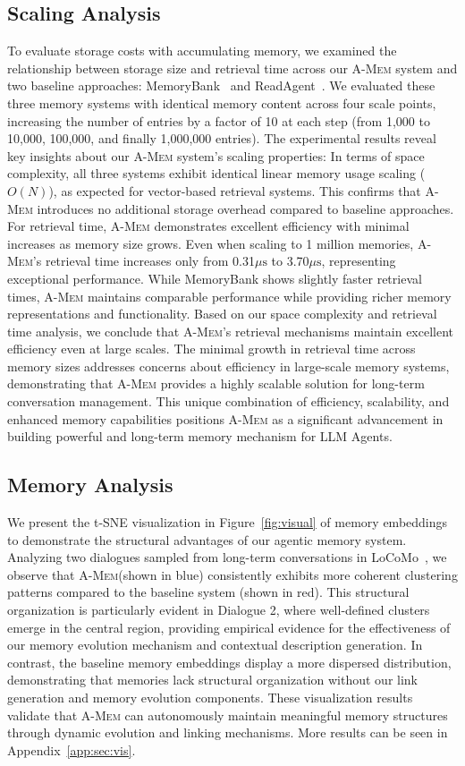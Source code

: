 \documentclass{article}
\newcommand{\ours}{\textsc{A-Mem}\xspace}
\begin{document}
\subsection{Scaling Analysis}
To evaluate storage costs with accumulating memory, we examined the relationship between storage size and retrieval time across our \ours system and two baseline approaches: MemoryBank~\cite{memorybank} and ReadAgent~\cite{readagent}. We evaluated these three memory systems with identical memory content across four scale points, increasing the number of entries by a factor of 10 at each step (from 1,000 to 10,000, 100,000, and finally 1,000,000 entries).
The experimental results reveal key insights about our \ours system's scaling properties: In terms of space complexity, all three systems exhibit identical linear memory usage scaling ($O(N)$), as expected for vector-based retrieval systems. This confirms that \ours introduces no additional storage overhead compared to baseline approaches. For retrieval time, \ours demonstrates excellent efficiency with minimal increases as memory size grows. Even when scaling to 1 million memories, \ours's retrieval time increases only from 0.31$\mu\text{s}$ to 3.70$\mu\text{s}$, representing exceptional performance. While MemoryBank shows slightly faster retrieval times, \ours maintains comparable performance while providing richer memory representations and functionality.
Based on our space complexity and retrieval time analysis, we conclude that \ours's retrieval mechanisms maintain excellent efficiency even at large scales. The minimal growth in retrieval time across memory sizes addresses concerns about efficiency in large-scale memory systems, demonstrating that \ours provides a highly scalable solution for long-term conversation management. This unique combination of efficiency, scalability, and enhanced memory capabilities positions \ours as a significant advancement in building powerful and long-term memory mechanism for LLM Agents.

\subsection{Memory Analysis}
We present the t-SNE visualization in Figure~\ref{fig:visual}  of memory embeddings to demonstrate the structural advantages of our agentic memory system. Analyzing two dialogues sampled from long-term conversations in LoCoMo~\cite{locomo}, we observe that \ours (shown in blue) consistently exhibits more coherent clustering patterns compared to the baseline system (shown in red). This structural organization is particularly evident in Dialogue 2, where well-defined clusters emerge in the central region, providing empirical evidence for the effectiveness of our memory evolution mechanism and contextual description generation. In contrast, the baseline memory embeddings display a more dispersed distribution, demonstrating that memories lack structural organization without our link generation and memory evolution components. These visualization results validate that \ours can autonomously maintain meaningful memory structures through dynamic evolution and linking mechanisms. More results can be seen in Appendix~\ref{app:sec:vis}.
\end{document}
